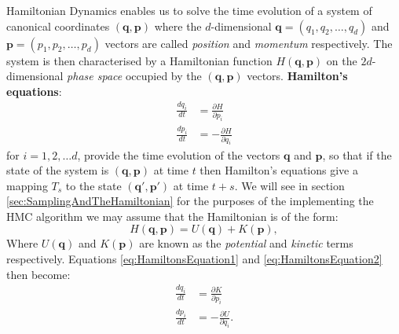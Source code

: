 \documentclass[12pt]{article}
\begin{document}
            Hamiltonian Dynamics enables us to solve the time evolution of a system of canonical coordinates $\left(\bm{q},\bm{p}\right)$ where the $d$-dimensional $\bm{q}=\left(q_1,q_2,\dots,q_d\right)$ and $\bm{p}=\left(p_1,p_2,\dots,p_d\right)$ vectors are called \textit{position} and \textit{momentum} respectively. The system is then characterised by a Hamiltonian function $H\left(\bm{q},\bm{p}\right)$ on the $2d$-dimensional \textit{phase space} occupied by the $\left(\bm{q},\bm{p}\right)$ vectors. \textbf{Hamilton's equations}:
            \begin{align}
                \label{eq:HamiltonsEquation1} \frac{dq_i}{dt} & = \frac{\partial H}{\partial p_i} \\
                \label{eq:HamiltonsEquation2} \frac{dp_i}{dt} & = -\frac{\partial H}{\partial q_i}
            \end{align}
            for $i = 1, 2, \dots d$, provide the time evolution of the vectors $\bm{q}$ and $\bm{p}$, so that if the state of the system is $\left(\bm{q},\bm{p}\right)$ at time $t$ then Hamilton's equations give a mapping $T_s$ to the state $\left(\bm{q}',\bm{p}'\right)$ at time $t+s$.  We will see in section \ref{sec:SamplingAndTheHamiltonian} for the purposes of the implementing the HMC algorithm we may assume that the Hamiltonian is of the form:
            \begin{equation}
                \label{eq:HamiltonianUPlusK}
                H\left(\bm{q},\bm{p}\right) = U\left(\bm{q}\right) + K\left(\bm{p}\right),
            \end{equation}
            Where $U\left(\bm{q}\right)$ and $K\left(\bm{p}\right)$ are known as the \textit{potential} and \textit{kinetic} terms respectively. Equations \ref{eq:HamiltonsEquation1} and \ref{eq:HamiltonsEquation2} then become:
            \begin{align}
                \label{eq:HamiltonsEquation1K} \frac{dq_i}{dt} & = \frac{\partial K}{\partial p_i} \\
                \label{eq:HamiltonsEquation2T} \frac{dp_i}{dt} & = -\frac{\partial U}{\partial q_i}.
            \end{align}
\end{document}

